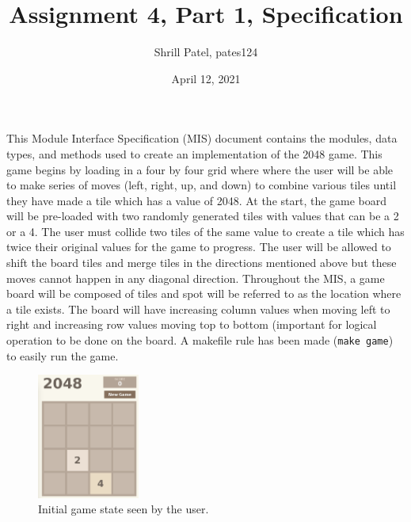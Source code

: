 \documentclass[12pt]{article}
\title{Assignment 4, Part 1, Specification}
\author{Shrill Patel, pates124}
\date{April 12, 2021}
\begin{document}
\maketitle
This Module Interface Specification (MIS) document contains the modules, data types, and 
methods used to create an implementation of the 2048 game. This game begins by loading in 
a four by four grid where where the user will be able to make series of moves (left, right,
up, and down) to combine various tiles until they have made a tile which has a value of 2048.
At the start, the game board will be pre-loaded with two randomly generated tiles with values 
that can be a 2 or a 4. The user must collide two tiles of the same value to create a tile
which has twice their original values for the game to progress. The user will be allowed to 
shift the board tiles and merge tiles in the directions mentioned above but these moves cannot 
happen in any diagonal direction. Throughout the MIS, a game board will be composed of tiles 
and spot will be referred to as the location where a tile exists. The board will have increasing
column values when moving left to right and increasing row values moving top to bottom (important 
for logical operation to be done on the board. A makefile rule has been made (\texttt{make game})
to easily run the game.
\begin{figure}[h]
    \centering
    \includegraphics[width=0.3\textwidth]{mygame.png}
    \caption{Initial game state seen by the user.}
    \label{Figure 1:}
\end{figure}

\newpage
\end{document}
